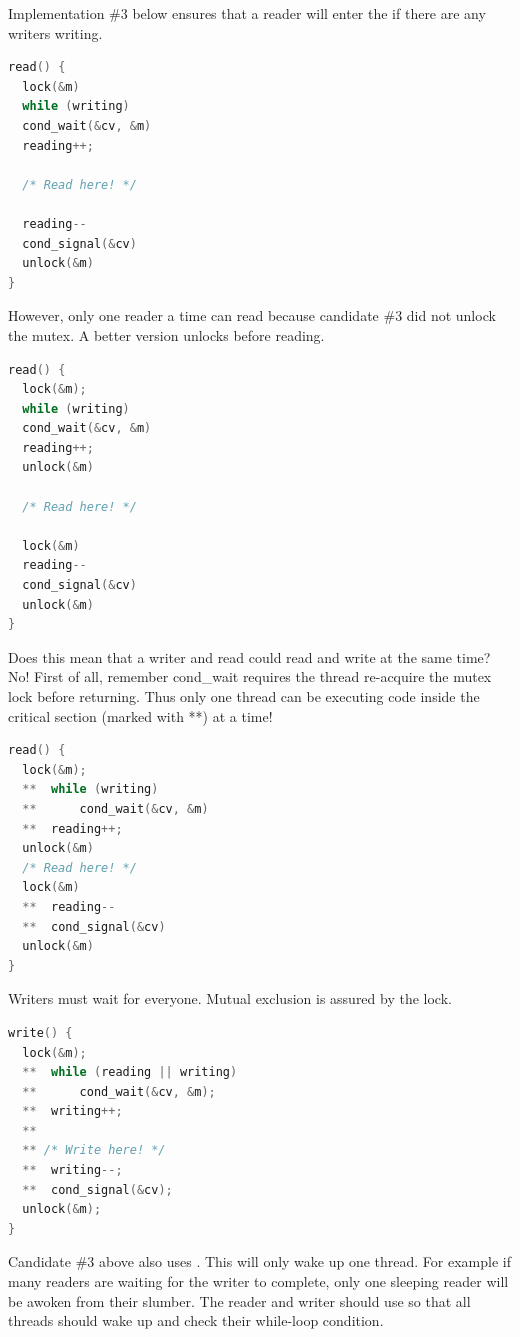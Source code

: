 Implementation \#3 below ensures that a reader will enter the  if there are any writers writing.

\begin{lstlisting}[language=C]
read() {
  lock(&m)
  while (writing)
  cond_wait(&cv, &m)
  reading++;

  /* Read here! */

  reading--
  cond_signal(&cv)
  unlock(&m)
}
\end{lstlisting}

However, only one reader a time can read because candidate \#3 did not unlock the mutex.
A better version unlocks before reading.

\begin{lstlisting}[language=C]
read() {
  lock(&m);
  while (writing)
  cond_wait(&cv, &m)
  reading++;
  unlock(&m)

  /* Read here! */

  lock(&m)
  reading--
  cond_signal(&cv)
  unlock(&m)
}
\end{lstlisting}

Does this mean that a writer and read could read and write at the same time?
No! First of all, remember cond\_wait requires the thread re-acquire the mutex lock before returning.
Thus only one thread can be executing code inside the critical section (marked with **) at a time!

\begin{lstlisting}[language=C]
read() {
  lock(&m);
  **  while (writing)
  **      cond_wait(&cv, &m)
  **  reading++;
  unlock(&m)
  /* Read here! */
  lock(&m)
  **  reading--
  **  cond_signal(&cv)
  unlock(&m)
}
\end{lstlisting}

Writers must wait for everyone.
Mutual exclusion is assured by the lock.

\begin{lstlisting}[language=C]
write() {
  lock(&m);
  **  while (reading || writing)
  **      cond_wait(&cv, &m);
  **  writing++;
  **
  ** /* Write here! */
  **  writing--;
  **  cond_signal(&cv);
  unlock(&m);
}
\end{lstlisting}

Candidate \#3 above also uses .
This will only wake up one thread.
For example if many readers are waiting for the writer to complete, only one sleeping reader will be awoken from their slumber.
The reader and writer should use  so that all threads should wake up and check their while-loop condition.

